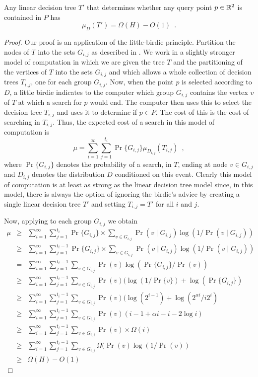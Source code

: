 \documentclass[charterfonts,lotsofwhite]{patmorin}
\begin{document}
\begin{thm}
Any linear decision tree $T'$ that determines whether any query point 
$p\in\mathbb{R}^2$ is contained in $P$ has
\[
   \mu_D(T') = \Omega(H) - O(1) \enspace .
\]
\end{thm}

\begin{proof}
Our proof is an application of the little-birdie principle.  Partition
the nodes of $T$ into the sets $G_{i,j}$ as described in
.  We work in a slightly stronger model of
computation in which we are given the tree $T$ and the partitioning of
the vertices of $T$ into the sets $G_{i,j}$ and which allows a whole
collection of decision trees $T_{i,j}$, one for each group $G_{i,j}$.
Now, when the point $p$ is selected according to $D$, a little birdie
indicates to the computer which group $G_{i,j}$ contains the vertex
$v$ of $T$ at which a search for $p$ would end.  The computer then
uses this to select the decision tree $T_{i,j}$ and uses it to
determine if $p\in P$.  The cost of this is the cost of searching in
$T_{i,j}$.  Thus, the expected cost of a search 
in this model of computation is
\[
     \mu = \sum_{i=1}^\infty \sum_{j=1}^{t_i}
	\Pr\{G_{i,j}\}\mu_{D_{i,j}}(T_{i,j}) \enspace ,
\]
where $\Pr\{G_{i,j}\}$ denotes the probability of a search, in $T$,
ending at node $v\in G_{i,j}$ and $D_{i,j}$ denotes the distribution
$D$ conditioned on this event.  Clearly this model of computation is
at least as strong as the linear decision tree model since, in this
model, there is always the option of ignoring the birdie's advice by
creating a single linear decision tree $T'$ and setting $T_{i,j}=T'$
for all $i$ and $j$.

Now, applying  to each group $G_{i,j}$ we obtain
\begin{eqnarray*}
\mu & \ge & \sum_{i=1}^{\infty}\sum_{j=1}^{t_i}\Pr\{G_{i,j}\}\times
	\sum_{v\in G_{i,j}}\Pr(v\mid G_{i,j})\log(1/\Pr(v\mid G_{i,j})) \\
& \ge & \sum_{i=1}^{\infty}\sum_{j=1}^{t_i-1}\Pr\{G_{i,j}\}\times
	\sum_{v\in G_{i,j}}\Pr(v\mid G_{i,j})\log(1/\Pr(v\mid G_{i,j})) \\
& = & \sum_{i=1}^{\infty}\sum_{j=1}^{t_i-1}
	\sum_{v\in G_{i,j}}\Pr(v)\log(\Pr\{G_{i,j}\}/\Pr(v)) \\
& \ge & \sum_{i=1}^{\infty}\sum_{j=1}^{t_i-1}
	\sum_{v\in G_{i,j}}\Pr(v)(\log(1/\Pr\{v\})+ \log(\Pr\{G_{i,j}\}) \\
& \ge & \sum_{i=1}^{\infty}\sum_{j=1}^{t_i-1}
	\sum_{v\in G_{i,j}}\Pr(v)(\log(2^{i-1}) + \log(2^{\alpha i}/i2^{i}) \\
& \ge & \sum_{i=1}^{\infty}\sum_{j=1}^{t_i-1}
	\sum_{v\in G_{i,j}}\Pr(v)(i-1 + \alpha i -i -2\log i) \\
& \ge & \sum_{i=1}^{\infty}\sum_{j=1}^{t_i-1}
	\sum_{v\in G_{i,j}}\Pr(v)\times \Omega(i) \\
& \ge & \sum_{i=1}^{\infty}\sum_{j=1}^{t_i-1}
	\sum_{v\in G_{i,j}}\Omega(\Pr(v)\log (1/\Pr(v)) \\
& \ge & \Omega(H) -O(1)
\end{eqnarray*}


\end{proof}
\end{document}
